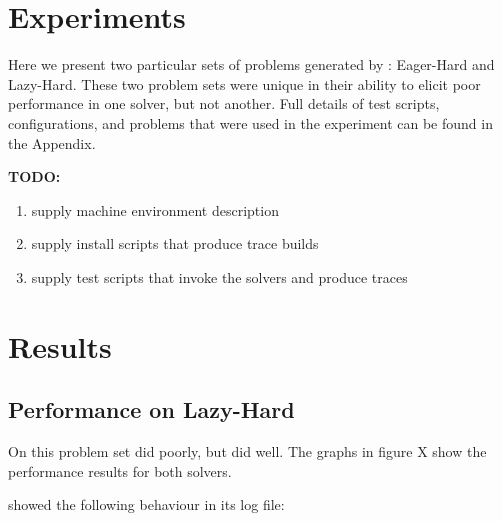 \section{Experiments}

    Here we present two particular sets of problems generated by \fuzzer{}: Eager-Hard and Lazy-Hard. These two problem sets were unique in their ability to elicit poor performance in one solver, but not another. Full details of test scripts, configurations, and problems that were used in the experiment can be found in the Appendix.

    \textbf{TODO:}

    \begin{enumerate}
        \item supply machine environment description
        \item supply install scripts that produce trace builds
        \item supply test scripts that invoke the solvers and produce traces
    \end{enumerate}

\section{Results}

    \subsection{Performance on Lazy-Hard}

        On this problem set \cvc{} did poorly, but \us{} did well. The graphs in figure X show the performance results for both solvers.

        \cvc{} showed the following behaviour in its log file:

